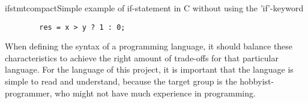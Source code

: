\begin{code}{ifstmtcompact}{Simple example of if-statement in C without using the 'if'-keyword}
	\begin{lstlisting}
		res = x > y ? 1 : 0;
	\end{lstlisting}
\end{code}

When defining the syntax of a programming language, it should balance these characteristics to achieve the right amount of trade-offs for that particular language. For the language of this project, it is important that the language is simple to read and understand, because the target group is the hobbyist-programmer, who might not have much experience in programming.